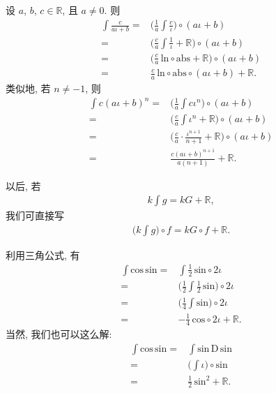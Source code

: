 \begin{example}
    设 $a$, $b$, $c \in \mathbb{R}$, 且 $a \neq 0$. 则
    \begin{align*}
        \int {\frac{c}{a\iota + b}}
        = {} & \Bigg( \frac{1}{a} \int {\frac{c}{\iota}} \Bigg) \circ (a\iota + b)                       \\
        = {} & \Bigg( \frac{c}{a} \int {\frac{1}{\iota}} + \mathbb{R} \Bigg) \circ (a\iota + b)          \\
        = {} & \Bigg( \frac{c}{a}\,\mathrm{ln} \circ \mathrm{abs} + \mathbb{R} \Bigg) \circ (a\iota + b) \\
        = {} & \frac{c}{a}\, \mathrm{ln} \circ \mathrm{abs} \circ (a\iota + b) + \mathbb{R}.
    \end{align*}
    类似地, 若 $n \neq -1$, 则
    \begin{align*}
        \int {c(a\iota + b)^n}
        = {} & \Bigg( \frac{1}{a} \int {c\iota^n} \Bigg) \circ (a\iota + b)                                \\
        = {} & \Bigg( \frac{c}{a} \int {\iota^n} + \mathbb{R} \Bigg) \circ (a\iota + b)                    \\
        = {} & \Bigg( \frac{c}{a} \cdot \frac{\iota^{n + 1}}{n + 1} + \mathbb{R} \Bigg) \circ (a\iota + b) \\
        = {} & \frac{c(a\iota + b)^{n + 1}}{a(n + 1)} + \mathbb{R}.
    \end{align*}
\end{example}

\begin{remark}
    以后, 若
    \begin{align*}
        k\int {g} = kG + \mathbb{R},
    \end{align*}
    我们可直接写
    \begin{align*}
        \Bigg( k\int {g} \Bigg) \circ f = kG \circ f + \mathbb{R}.
    \end{align*}
\end{remark}

\begin{example}
    利用三角公式, 有
    \begin{align*}
        \int {\mathrm{cos}\,\mathrm{sin}}
        = {} & \int {\frac{1}{2}\, \mathrm{sin} \circ {2\iota}}                           \\
        = {} & \Bigg( \frac{1}{2} \int {\frac{1}{2}\, \mathrm{sin}} \Bigg) \circ {2\iota} \\
        = {} & \Bigg( \frac{1}{4} \int {\mathrm{sin}} \Bigg) \circ {2\iota}               \\
        = {} & {-\frac{1}{4}}\, \mathrm{cos} \circ {2\iota} + \mathbb{R}.
    \end{align*}
    当然, 我们也可以这么解:
    \begin{align*}
        \int {\mathrm{cos}\,\mathrm{sin}}
        = {} & \int {\mathrm{sin}\, \mathrm{D}\,\mathrm{sin}} \\
        = {} & \Bigg( \int {\iota} \Bigg) \circ \mathrm{sin}  \\
        = {} & \frac{1}{2}\, \mathrm{sin}^2 + \mathbb{R}.
    \end{align*}
\end{example}

